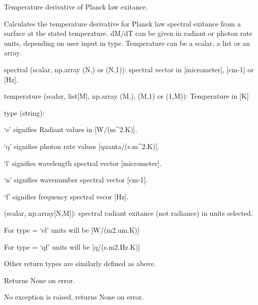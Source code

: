 \documentclass[a4paper,10pt,english]{sphinxmanual}
\begin{document}

\begin{fulllineitems}
\label{ryplanck:pyradi.ryplanck.dplanck}
Temperature derivative of Planck law exitance.

Calculates the temperature derivative for Planck law spectral exitance
from a surface at the stated temperature. dM/dT can be given in radiant or
photon rate units, depending on user input in type. Temperature can be a 
scalar, a list or an array.
\begin{description}
\item[{Args:}] \leavevmode
\begin{DUlineblock}{0em}
\item[] spectral (scalar, np.array (N,) or (N,1)):  spectral vector in  {[}micrometer{]}, {[}cm-1{]} or {[}Hz{]}.
\item[] temperature (scalar, list{[}M{]}, np.array (M,), (M,1) or (1,M)):  Temperature in {[}K{]}
\item[] type (string):
\item[]
\begin{DUlineblock}{\DUlineblockindent}
\item[] `e' signifies Radiant values in {[}W/(m\textasciicircum{}2.K){]}.
\item[] `q' signifies photon rate values  {[}quanta/(s.m\textasciicircum{}2.K){]}.
\item[] `l' signifies wavelength spectral vector  {[}micrometer{]}.
\item[] `n' signifies wavenumber spectral vector {[}cm-1{]}.
\item[] `f' signifies frequency spectral vecor {[}Hz{]}.
\end{DUlineblock}
\end{DUlineblock}

\item[{Returns:}] \leavevmode
\begin{DUlineblock}{0em}
\item[] (scalar, np.array{[}N,M{]}):  spectral radiant exitance (not radiance) in units selected.
\item[] For type = `el' units will be {[}W/(m2.um.K){]}
\item[] For type = `qf' units will be {[}q/(s.m2.Hz.K){]}
\item[] Other return types are similarly defined as above.
\item[] Returns None on error.
\end{DUlineblock}

\item[{Raises:}] \leavevmode
\begin{DUlineblock}{0em}
\item[] No exception is raised, returns None on error.
\end{DUlineblock}

\end{description}

\end{fulllineitems}
\end{document}
